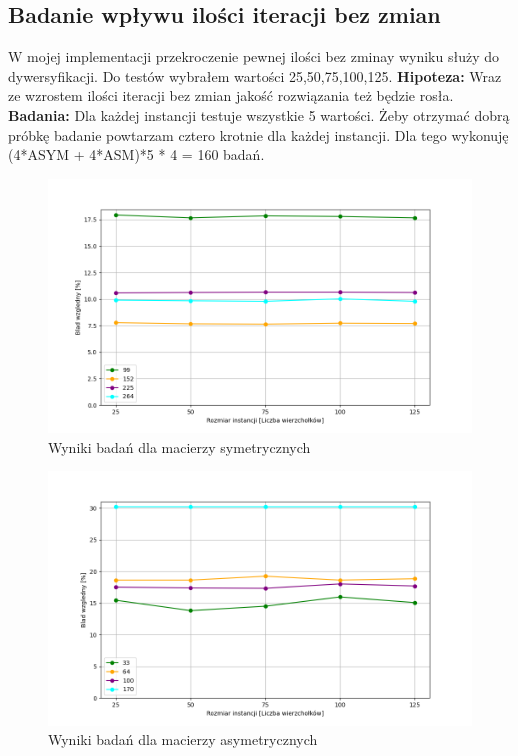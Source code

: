 \documentclass{article}
\begin{document}
      \subsection{Badanie wpływu ilości iteracji bez zmian}
        W mojej implementacji przekroczenie pewnej ilości bez zminay wyniku
        służy do dywersyfikacji. Do testów wybrałem wartości 25,50,75,100,125.\linebreak
        \textbf{Hipoteza: } Wraz ze wzrostem ilości iteracji bez zmian jakość
        rozwiązania też będzie rosła.\linebreak
        \textbf{Badania: } Dla każdej instancji testuje wszystkie 5 wartości. 
        Żeby otrzymać dobrą próbkę badanie powtarzam cztero krotnie dla każdej 
        instancji. Dla tego wykonuję (4*ASYM + 4*ASM)*5 * 4 = 160 badań.\linebreak
        \FloatBarrier
        
        \FloatBarrier
        \begin{figure}[ht]
          \centering
          \includegraphics[width=\textwidth]{src/plots/symTsCount.png}
          \caption{Wyniki badań dla macierzy symetrycznych}
          \label{fig:symCount}
        \end{figure}
        \begin{figure}[ht]
          \centering
          \includegraphics[width=\textwidth]{src/plots/asymTsCount.png}
          \caption{Wyniki badań dla macierzy asymetrycznych}
          \label{fig:asymCount}
        \end{figure}
\end{document}
